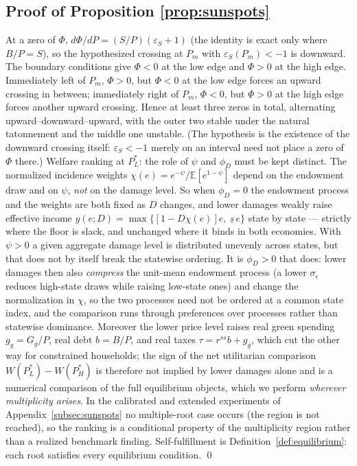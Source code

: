 \documentclass[12pt]{article}
\newcommand{\E}{\mathbb{E}}
\newcommand{\Sfun}{S}
\begin{document}
\subsection{Proof of Proposition \ref{prop:sunspots}}
At a zero of $\Phi$, $d\Phi/dP=(\Sfun/P)(\varepsilon_S+1)$ (the identity is
exact only where $B/P=\Sfun$), so the hypothesized crossing at $P_m$ with
$\varepsilon_S(P_m)<-1$ is downward. The boundary conditions give $\Phi<0$
at the low edge and $\Phi>0$ at the high edge. Immediately left of $P_m$,
$\Phi>0$, but $\Phi<0$ at the low edge forces an upward crossing in between;
immediately right of $P_m$, $\Phi<0$, but $\Phi>0$ at the high edge forces
another upward crossing. Hence at least three zeros in total,
alternating upward--downward--upward, with the outer two stable under the
natural tatonnement and the middle one unstable. (The hypothesis is the
existence of the downward crossing itself: $\varepsilon_S<-1$ merely on an
interval need not place a zero of $\Phi$ there.) Welfare ranking at $P_L^{*}$:
the role of $\psi$ and $\phi_D$ must be kept distinct. The normalized
incidence weights $\chi(e)=e^{-\psi}/\E[e^{1-\psi}]$ depend on the
endowment draw and on $\psi$, \emph{not} on the damage level. So when
$\phi_D=0$ the endowment process and the weights are both fixed as $D$
changes, and lower damages weakly raise effective income
$y(e;D)=\max\{[1-D\chi(e)]e,\ \underline{s}\,e\}$ state by state --- strictly
where the floor is slack, and unchanged where it binds in both economies.
With $\psi>0$ a given aggregate damage level is distributed unevenly across
states, but that does not by itself break the statewise ordering. It is
$\phi_D>0$ that does: lower damages then also \emph{compress} the unit-mean
endowment process (a lower $\sigma_\epsilon$ reduces high-state draws while
raising low-state ones) and change the normalization in $\chi$, so the two
processes need not be ordered at a common state index, and the comparison
runs through preferences over processes rather than statewise dominance.
Moreover the lower price level raises real green spending
$g_g=G_g/P$, real debt $b=B/P$, and real taxes $\tau=r^{ss}b+g_g$, which cut
the other way for constrained households; the sign of the net utilitarian
comparison $W(P_L^{*})-W(P_H^{*})$ is therefore not implied by lower damages
alone and is a numerical comparison of the full equilibrium objects, which
we perform \emph{wherever multiplicity arises}. In the calibrated
and extended experiments of Appendix~\ref{subsec:sunspots} no multiple-root
case occurs (the region is not reached), so the ranking is a conditional
property of the multiplicity region rather than a realized benchmark finding.
Self-fulfillment is Definition~\ref{def:equilibrium}: each root satisfies
every equilibrium condition. \qed
\end{document}
